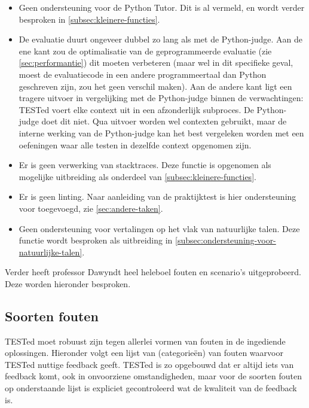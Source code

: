 \begin{itemize}
    \item Geen ondersteuning voor de Python Tutor.
    Dit is al vermeld, en wordt verder besproken in \cref{subsec:kleinere-functies}.
    \item De evaluatie duurt ongeveer dubbel zo lang als met de Python-judge.
    Aan de ene kant zou de optimalisatie van de geprogrammeerde evaluatie (zie \cref{sec:performantie}) dit moeten verbeteren (maar wel in dit specifieke geval, moest de evaluatiecode in een andere programmeertaal dan Python geschreven zijn, zou het geen verschil maken).
    Aan de andere kant ligt een tragere uitvoer in vergelijking met de Python-judge binnen de verwachtingen: TESTed voert elke context uit in een afzonderlijk subproces.
    De Python-judge doet dit niet.
    Qua uitvoer worden wel contexten gebruikt, maar de interne werking van de Python-judge kan het best vergeleken worden met een oefeningen waar alle testen in dezelfde context opgenomen zijn.
    \item Er is geen verwerking van stacktraces.
    Deze functie is opgenomen als mogelijke uitbreiding als onderdeel van \cref{subsec:kleinere-functies}.
    \item Er is geen linting.
    Naar aanleiding van de praktijktest is hier ondersteuning voor toegevoegd, zie \cref{sec:andere-taken}.
    \item Geen ondersteuning voor vertalingen op het vlak van natuurlijke talen.
    Deze functie wordt besproken als uitbreiding in \cref{subsec:ondersteuning-voor-natuurlijke-talen}.
\end{itemize}

Verder heeft professor Dawyndt heel heleboel fouten en scenario's uitgeprobeerd.
Deze worden hieronder besproken.

\subsection{Soorten fouten}\label{subsec:soorten-fouten}

TESTed moet robuust zijn tegen allerlei vormen van fouten in de ingediende oplossingen.
Hieronder volgt een lijst van (categorieën) van fouten waarvoor TESTed nuttige feedback geeft.
TESTed is zo opgebouwd dat er altijd iets van feedback komt, ook in onvoorziene omstandigheden, maar voor de soorten fouten op onderstaande lijst is expliciet gecontroleerd wat de kwaliteit van de feedback is.

